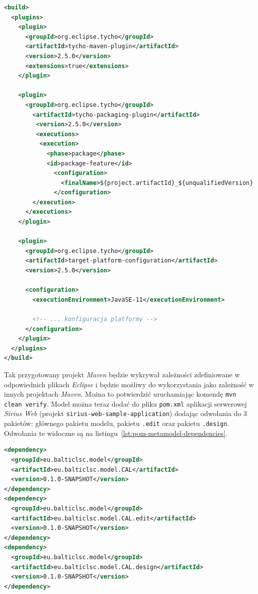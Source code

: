 \begin{lstlisting}[language=XML,
    caption={Konfiguracja rozszerzeń \emph{Maven Tycho} w \texttt{pom.xml}.},
    label={lst:pom-maven-tycho-plugins}]
<build>
  <plugins>
    <plugin>
      <groupId>org.eclipse.tycho</groupId>
      <artifactId>tycho-maven-plugin</artifactId>
      <version>2.5.0</version>
      <extensions>true</extensions>
    </plugin>

    <plugin>
      <groupId>org.eclipse.tycho</groupId>
        <artifactId>tycho-packaging-plugin</artifactId>
         <version>2.5.0</version>
         <executions>
          <execution>
            <phase>package</phase>
            <id>package-feature</id>
              <configuration>
                <finalName>${project.artifactId}_${unqualifiedVersion}.${buildQualifier}</finalName>
              </configuration>
        </execution>
      </executions>
    </plugin>

    <plugin>
      <groupId>org.eclipse.tycho</groupId>
      <artifactId>target-platform-configuration</artifactId>
      <version>2.5.0</version>

      <configuration>
        <executionEnvironment>JavaSE-11</executionEnvironment>

        <!-- ... konfiguracja platformy -->
      </configuration>
    </plugin>
  </plugins>
</build>
\end{lstlisting}

Tak przygotowany projekt \emph{Maven} będzie wykrywał zależności zdefiniowane w
odpowiednich plikach \emph{Eclipse} i będzie możliwy do wykorzystania jako
zależność w innych projektach \emph{Maven}. Można to potwierdzić uruchamiając
komendę \lstinline{mvn clean verify}. Model można teraz dodać do pliku
\texttt{pom.xml} aplikacji serwerowej \emph{Sirius Web} (projekt
\texttt{sirius-web-sample-application}) dodając odwołania do 3 pakietów:
głównego pakietu modelu, pakietu \texttt{.edit} oraz pakietu \texttt{.design}.
Odwołania te widoczne są na listingu~\ref{lst:pom-metamodel-dependencies}.

\begin{lstlisting}[language=XML,
    caption={Odwołania do pakietów metamodelu w \texttt{pom.xml} aplikacji
    serwerowej \emph{Sirius Web}},
    label={lst:pom-metamodel-dependencies}]
<dependency>
  <groupId>eu.balticlsc.model</groupId>
  <artifactId>eu.balticlsc.model.CAL</artifactId>
  <version>0.1.0-SNAPSHOT</version>
</dependency>
<dependency>
  <groupId>eu.balticlsc.model</groupId>
  <artifactId>eu.balticlsc.model.CAL.edit</artifactId>
  <version>0.1.0-SNAPSHOT</version>
</dependency>
<dependency>
  <groupId>eu.balticlsc.model</groupId>
  <artifactId>eu.balticlsc.model.CAL.design</artifactId>
  <version>0.1.0-SNAPSHOT</version>
</dependency>
\end{lstlisting}

